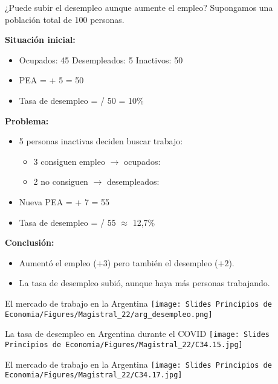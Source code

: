 \documentclass{beamer}
\begin{document}
\begin{frame}{¿Puede subir el desempleo aunque aumente el empleo?}
\small
Supongamos una población total de 100 personas.

\textbf{Situación inicial:}
\begin{itemize}
    \item Ocupados: 45 \quad Desempleados: 5 \quad Inactivos: 50
    \item PEA =  + 5 = 50
    \item Tasa de desempleo =  / 50 = 10\%
\end{itemize}
\textbf{Problema:}
\begin{itemize}
    \item 5 personas inactivas deciden buscar trabajo:
    \begin{itemize}
        \item 3 consiguen empleo $\rightarrow$ ocupados: 
        \item 2 no consiguen $\rightarrow$ desempleados: 
    \end{itemize}
    \item Nueva PEA =  + 7 = 55
    \item Tasa de desempleo =  / 55 $\approx$ 12{,}7\%
\end{itemize}
\textbf{Conclusión:}
\begin{itemize}
    \item Aumentó el empleo (\(+3\)) pero también el desempleo (\(+2\)).
    \item La tasa de desempleo subió, aunque haya más personas trabajando.
\end{itemize}
\end{frame}

\begin{frame}{El mercado de trabajo en la Argentina}
    \centering
    \texttt{[image: Slides Principios de Economia/Figures/Magistral\_22/arg\_desempleo.png]}
\end{frame}

\begin{frame}{La tasa de desempleo en Argentina durante el COVID}
    \centering
    \texttt{[image: Slides Principios de Economia/Figures/Magistral\_22/C34.15.jpg]}
\end{frame}

\begin{frame}{El mercado de trabajo en la Argentina}
\centering\texttt{[image: Slides Principios de Economia/Figures/Magistral\_22/C34.17.jpg]}
\end{frame}
\end{document}
